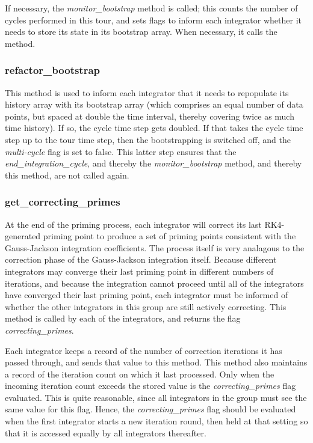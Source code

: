 If necessary, the \textit{monitor\_bootstrap}
method is called; this
counts the number of cycles performed in this tour, and sets flags to
inform each integrator whether it needs to store its state in its
bootstrap array. When necessary, it calls the
 method.

\subsubsection{refactor\_bootstrap}\label{ref:GJ_controls_refactor_bootstrap}

This method is used to inform each integrator that it needs to
repopulate its history array with its bootstrap array (which comprises
an equal number of data points, but spaced at double the time interval,
thereby covering twice as much time history). If so, the cycle time
step gets doubled. If that takes the cycle time step up to the tour
time step, then the bootstrapping is switched off, and the \textit{multi-cycle}
flag is set to false. This latter step ensures that the
\textit{end\_integration\_cycle}, and thereby the \textit{monitor\_bootstrap}
method, and thereby this method, are not called
again.

\subsubsection{get\_correcting\_primes}\label{ref:GJ_get_correcting_primes}
At the end of the priming process, each integrator will correct its last
RK4-generated priming point to produce a set of priming points consistent
with the Gauss-Jackson integration coefficients.  The process itself is
very analagous to the correction phase of the Gauss-Jackson integration
itself.  Because different integrators may converge their last priming point
in different numbers of iterations, and because the integration cannot proceed
until all of the integrators have converged their last priming point, each
integrator must be informed of whether the other integrators in this group
are still actively correcting.  This method is called by each of the 
integrators, and returns the flag \textit{correcting\_primes}.

Each integrator keeps a record of the number of correction iterations it has
passed through, and sends that value to this method.  This method also
maintains a record of the iteration count on which it last processed.
Only when the incoming iteration count exceeds the stored value is the
\textit{correcting\_primes} flag evaluated.  This is quite reasonable,
since all integrators in the group must see the same value for this flag.  
Hence, the \textit{correcting\_primes} flag should be evaluated when the first 
integrator starts a new iteration round, then held at that setting so that it 
is accessed equally by all 
integrators thereafter.


